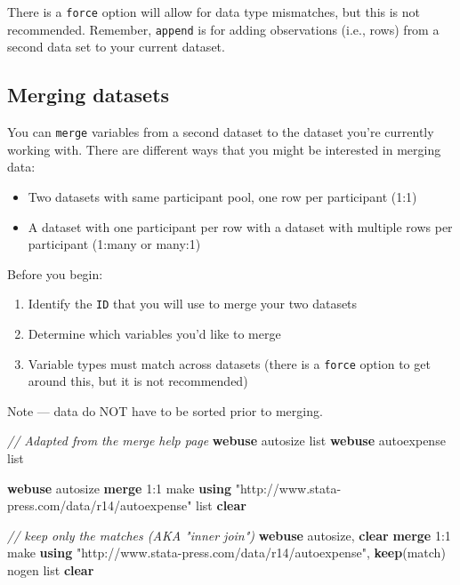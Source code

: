 \documentclass[
]{book}
\newenvironment{Shaded}{\begin{snugshade}}{\end{snugshade}}
\newcommand{\CommentTok}[1]{\textcolor[rgb]{0.56,0.35,0.01}{\textit{#1}}}
\newcommand{\FunctionTok}[1]{\textcolor[rgb]{0.00,0.00,0.00}{#1}}
\newcommand{\KeywordTok}[1]{\textcolor[rgb]{0.13,0.29,0.53}{\textbf{#1}}}
\newcommand{\NormalTok}[1]{#1}
\newcommand{\OtherTok}[1]{\textcolor[rgb]{0.56,0.35,0.01}{#1}}
\newcommand{\StringTok}[1]{\textcolor[rgb]{0.31,0.60,0.02}{#1}}
\providecommand{\tightlist}{%
  \setlength{\itemsep}{0pt}\setlength{\parskip}{0pt}}
\begin{document}
There is a \texttt{force} option will allow for data type mismatches, but this is not recommended. Remember, \texttt{append} is for adding observations (i.e., rows) from a second data set to your current dataset.

\hypertarget{merging-datasets}{%
\subsection{Merging datasets}\label{merging-datasets}}

You can \texttt{merge} variables from a second dataset to the dataset you're currently working with. There are different ways that you might be interested in merging data:

\begin{itemize}
\tightlist
\item
  Two datasets with same participant pool, one row per participant (1:1)
\item
  A dataset with one participant per row with a dataset with multiple rows per participant (1:many or many:1)
\end{itemize}

Before you begin:

\begin{enumerate}
\def\labelenumi{\arabic{enumi}.}
\tightlist
\item
  Identify the \texttt{ID} that you will use to merge your two datasets
\item
  Determine which variables you'd like to merge
\item
  Variable types must match across datasets (there is a \texttt{force} option to get around this, but it is not recommended)
\end{enumerate}

Note --- data do NOT have to be sorted prior to merging.

\begin{Shaded}
\begin{Highlighting}[]
\CommentTok{// Adapted from the merge help page}
\KeywordTok{webuse}\NormalTok{ autosize }
\OtherTok{list}
\KeywordTok{webuse}\NormalTok{ autoexpense}
\OtherTok{list}

\KeywordTok{webuse}\NormalTok{ autosize}
\KeywordTok{merge}\NormalTok{ 1:1 make }\KeywordTok{using} \StringTok{"http://www.stata{-}press.com/data/r14/autoexpense"}
\OtherTok{list}
\KeywordTok{clear}

\CommentTok{// keep only the matches (AKA "inner join")}
\KeywordTok{webuse}\NormalTok{ autosize, }\KeywordTok{clear}
\KeywordTok{merge}\NormalTok{ 1:1 make }\KeywordTok{using} \StringTok{"http://www.stata{-}press.com/data/r14/autoexpense"}\NormalTok{, }\KeywordTok{keep}\NormalTok{(}\FunctionTok{match}\NormalTok{) nogen}
\OtherTok{list}
\KeywordTok{clear}
\end{Highlighting}
\end{Shaded}
\end{document}
